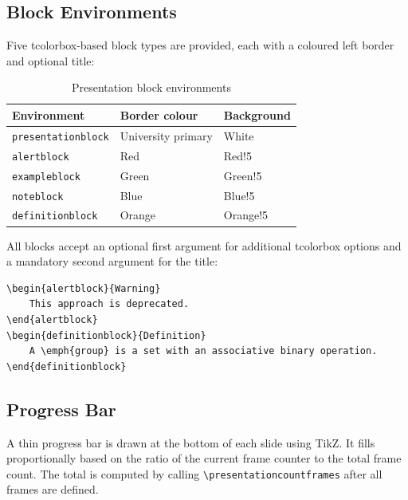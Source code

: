 \subsection{Block Environments}

Five tcolorbox-based block types are provided, each with a coloured left
border and optional title:

\begin{table}[htbp]
    \centering
    \caption{Presentation block environments}
    \label{tab:presentation-blocks}
    \begin{tabular}{@{} l l l @{}}
        \toprule
        \textbf{Environment} & \textbf{Border colour} & \textbf{Background} \\
        \midrule
        \texttt{presentationblock} & University primary & White \\
        \texttt{alertblock}        & Red               & Red!5 \\
        \texttt{exampleblock}      & Green             & Green!5 \\
        \texttt{noteblock}         & Blue              & Blue!5 \\
        \texttt{definitionblock}   & Orange            & Orange!5 \\
        \bottomrule
    \end{tabular}
\end{table}

All blocks accept an optional first argument for additional tcolorbox
options and a mandatory second argument for the title:

\begin{verbatim}
\begin{alertblock}{Warning}
    This approach is deprecated.
\end{alertblock}
\begin{definitionblock}{Definition}
    A \emph{group} is a set with an associative binary operation.
\end{definitionblock}
\end{verbatim}

\subsection{Progress Bar}

A thin progress bar is drawn at the bottom of each slide using TikZ.  It
fills proportionally based on the ratio of the current frame counter to
the total frame count.  The total is computed by calling
\texttt{\textbackslash presentationcountframes} after all frames are
defined.


